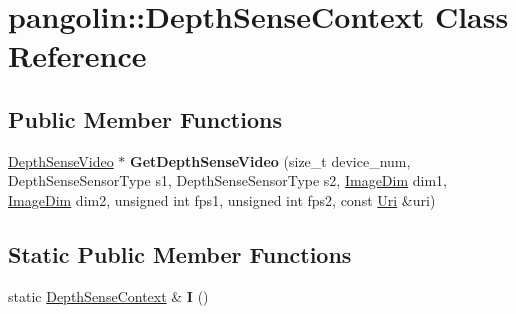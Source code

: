 \hypertarget{classpangolin_1_1_depth_sense_context}{}\section{pangolin\+:\+:Depth\+Sense\+Context Class Reference}
\label{classpangolin_1_1_depth_sense_context}
\subsection*{Public Member Functions}
\begin{DoxyCompactItemize}
\item 
\hyperlink{classpangolin_1_1_depth_sense_video}{Depth\+Sense\+Video} $\ast$ {\bfseries Get\+Depth\+Sense\+Video} (size\+\_\+t device\+\_\+num, Depth\+Sense\+Sensor\+Type s1, Depth\+Sense\+Sensor\+Type s2, \hyperlink{structpangolin_1_1_image_dim}{Image\+Dim} dim1, \hyperlink{structpangolin_1_1_image_dim}{Image\+Dim} dim2, unsigned int fps1, unsigned int fps2, const \hyperlink{classpangolin_1_1_uri}{Uri} \&uri)\hypertarget{classpangolin_1_1_depth_sense_context_a2b1f4bedc98fbe76ac5e09df121f0855}{}\label{classpangolin_1_1_depth_sense_context_a2b1f4bedc98fbe76ac5e09df121f0855}

\end{DoxyCompactItemize}
\subsection*{Static Public Member Functions}
\begin{DoxyCompactItemize}
\item 
static \hyperlink{classpangolin_1_1_depth_sense_context}{Depth\+Sense\+Context} \& {\bfseries I} ()\hypertarget{classpangolin_1_1_depth_sense_context_a9dde63e7479ebbc5055ca9499650971a}{}\label{classpangolin_1_1_depth_sense_context_a9dde63e7479ebbc5055ca9499650971a}

\end{DoxyCompactItemize}
